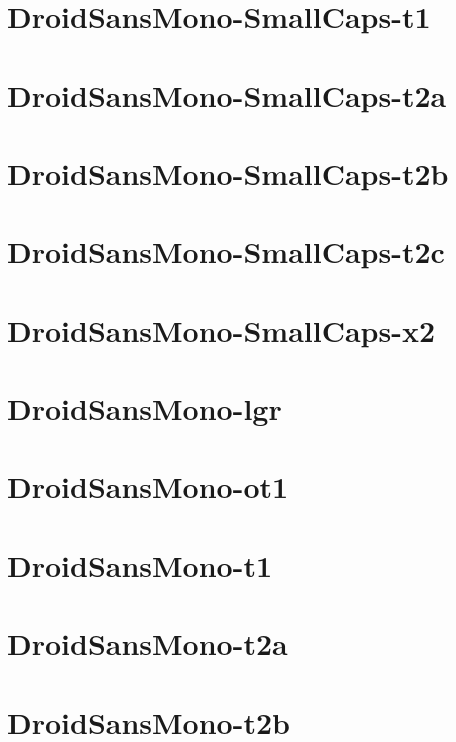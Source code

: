 \documentclass{article}
\begin{document}
\section{DroidSansMono-SmallCaps-t1}

\section{DroidSansMono-SmallCaps-t2a}

\section{DroidSansMono-SmallCaps-t2b}

\section{DroidSansMono-SmallCaps-t2c}

\section{DroidSansMono-SmallCaps-x2}

\section{DroidSansMono-lgr}

\section{DroidSansMono-ot1}

\section{DroidSansMono-t1}

\section{DroidSansMono-t2a}

\section{DroidSansMono-t2b}
\end{document}
